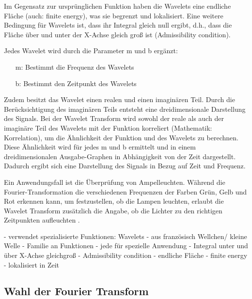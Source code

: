 Im Gegensatz zur ursprünglichen Funktion haben die Wavelets eine endliche Fläche (auch: finite energy), was sie begrenzt und lokalisiert. Eine weitere Bedingung für Wavelets ist, dass ihr Integral gleich null ergibt, d.h., dass die Fläche über und unter der X-Achse gleich groß ist (Admissibility condition). 

\par

Jedes Wavelet wird durch die Parameter m und b ergänzt:

%
\begin{itemize}
    \item[m:] Bestimmt die Frequenz des Wavelets
    \item[b:] Bestimmt den Zeitpunkt des Wavelets
\end{itemize}
%

Zudem besitzt das Wavelet einen realen und einen imaginären Teil. Durch die Berücksichtigung des imaginären Teils entsteht eine dreidimensionale Darstellung des Signals. Bei der Wavelet Transform wird sowohl der reale als auch der imaginäre Teil des Wavelets mit der Funktion korreliert (Mathematik: Korrelation), um die Ähnlichkeit der Funktion und des Wavelets zu berechnen. Diese Ähnlichkeit wird für jedes m und b ermittelt und in einem dreidimensionalen Ausgabe-Graphen in Abhängigkeit von der Zeit dargestellt. Dadurch ergibt sich eine Darstellung des Signals in Bezug auf Zeit und Frequenz.

\par

Ein Anwendungsfall ist die Überprüfung von Ampelleuchten. Während die Fourier-Transformation die verschiedenen Frequenzen der Farben Grün, Gelb und Rot erkennen kann, um festzustellen, ob die Lampen leuchten, erlaubt die Wavelet Transform zusätzlich die Angabe, ob die Lichter zu den richtigen Zeitpunkten aufleuchten \parencite{wavelets}.

%
 - verwendet spezialisierte Funktionen: Wavelets
 - aus französisch Wellchen/ kleine Welle
 - Familie an Funktionen
   - jede für spezielle Anwendung
 - Integral unter und über X-Achse gleichgroß
   - Admissibility condition
 - endliche Fläche
   - finite energy
   - lokalisiert in Zeit

%
\subsection{Wahl der Fourier Transform}
%

